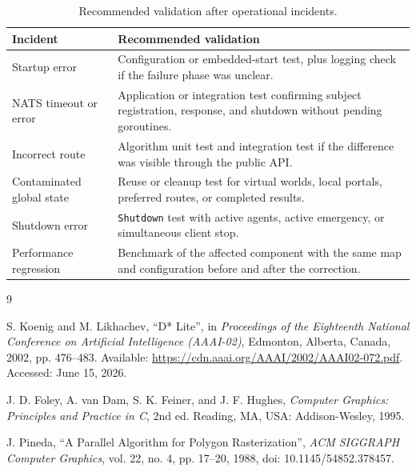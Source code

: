 \documentclass[12pt,a4paper]{report}
\begin{document}
\begin{table}[H]
\centering
\begin{tabular}{|p{}|p{}|}
\hline
\textbf{Incident} & \textbf{Recommended validation} \\
\hline
Startup error &
Configuration or embedded-start test, plus logging check if the failure phase
was unclear. \\
\hline
NATS timeout or error &
Application or integration test confirming subject registration, response, and
shutdown without pending goroutines. \\
\hline
Incorrect route &
Algorithm unit test and integration test if the difference was visible through
the public API. \\
\hline
Contaminated global state &
Reuse or cleanup test for virtual worlds, local portals, preferred routes, or
completed results. \\
\hline
Shutdown error &
\texttt{Shutdown} test with active agents, active emergency, or simultaneous
client stop. \\
\hline
Performance regression &
Benchmark of the affected component with the same map and configuration before
and after the correction. \\
\hline
\end{tabular}
\caption{Recommended validation after operational incidents.}
\end{table}

\begin{thebibliography}{9}

S. Koenig and M. Likhachev, \enquote{D* Lite}, in \emph{Proceedings of the
Eighteenth National Conference on Artificial Intelligence (AAAI-02)}, Edmonton,
Alberta, Canada, 2002, pp. 476--483. Available:
\url{https://cdn.aaai.org/AAAI/2002/AAAI02-072.pdf}. Accessed: June 15, 2026.

J. D. Foley, A. van Dam, S. K. Feiner, and J. F. Hughes, \emph{Computer
Graphics: Principles and Practice in C}, 2nd ed. Reading, MA, USA:
Addison-Wesley, 1995.

J. Pineda, \enquote{A Parallel Algorithm for Polygon Rasterization}, \emph{ACM
SIGGRAPH Computer Graphics}, vol. 22, no. 4, pp. 17--20, 1988, doi:
10.1145/54852.378457.

\end{thebibliography}
\end{document}
